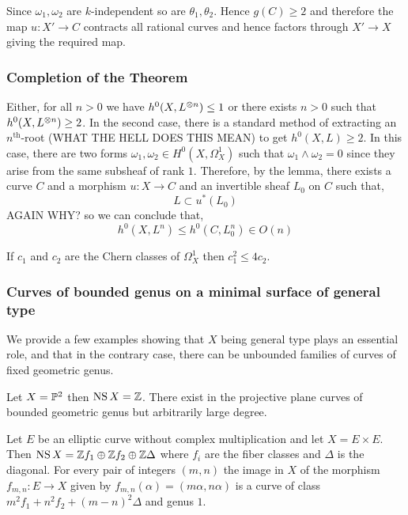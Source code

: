 \documentclass[main.tex]{subfiles}
\begin{document}
Since $\omega_1, \omega_2$ are $k$-independent so are $\theta_1, \theta_2$. Hence $g(C) \ge 2$ and therefore the map $u : X' \to C$ contracts all rational curves and hence factors through $X' \to X$ giving the required map.




\subsubsection{Completion of the Theorem}

Either, for all $n > 0$ we have $h^0(X, L^{\ot n}) \le 1$ or there exists $n > 0$ such that $h^0(X, L^{\ot n}) \ge 2$. In the second case, there is a standard method of extracting an $n^{\text{th}}$-root {\color{red} (WHAT THE HELL DOES THIS MEAN)} to get $h^0(X, L) \ge 2$. In this case, there are two forms $\omega_1, \omega_2 \in H^0(X, \Omega^1_X)$ such that $\omega_1 \wedge \omega_2 = 0$ since they arise from the same subsheaf of rank $1$. Therefore, by the lemma, there exists a curve $C$ and a morphism $u : X \to C$ and an invertible sheaf $L_0$ on $C$ such that,
\[ L \subset u^*(L_0) \]
{\color{red} AGAIN WHY?}
so we can conclude that,
\[ h^0(X, L^n) \le h^0(C, L_0^n) \in O(n) \]

\begin{cor}
If $c_1$ and $c_2$ are the Chern classes of $\Omega^1_X$ then $c_1^2 \le 4 c_2$.
\end{cor}

\subsubsection{Curves of bounded genus on a minimal surface of general type}

We provide a few examples showing that $X$ being general type plays an essential role, and that in the contrary case, there can be unbounded families of curves of fixed geometric genus.

\begin{example}
Let $X = \P^2$ then $\NS{X} = \Z$. There exist in the projective plane curves of bounded geometric genus but arbitrarily large degree.
\end{example}

\begin{example}
Let $E$ be an elliptic curve without complex multiplication and let $X = E \times E$. Then $\NS{X} = \Z f_1 \oplus \Z f_2 \oplus \Z \Delta$ where $f_i$ are the fiber classes and $\Delta$ is the diagonal. For every pair of integers $(m, n)$ the image in $X$ of the morphism $f_{m,n} : E \to X$ given by $f_{m,n}(\alpha) = (m \alpha, n \alpha)$ is a curve of class $m^2 f_1 + n^2 f_2 + (m-n)^2 \Delta$ and genus $1$.
\end{example}
\end{document}
